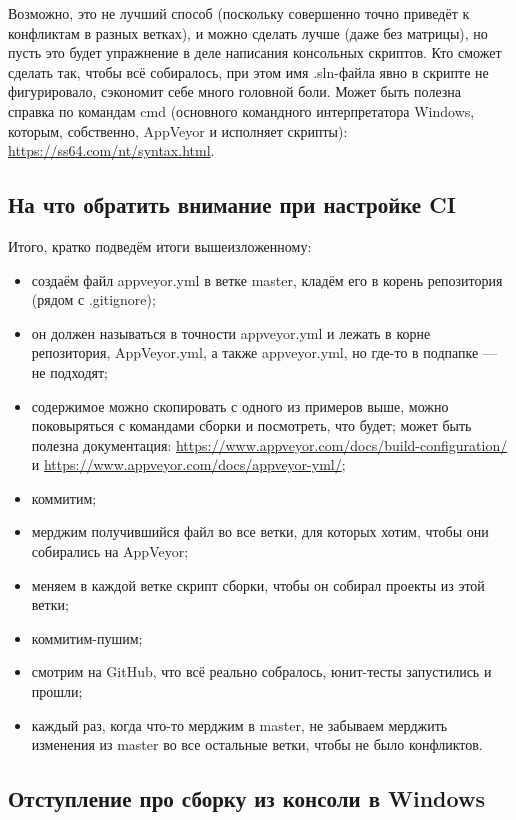 \documentclass[a5paper]{article}
\begin{document}
Возможно, это не лучший способ (поскольку совершенно точно приведёт к конфликтам в разных ветках), и можно сделать лучше (даже без матрицы), но пусть это будет упражнение в деле написания консольных скриптов. Кто сможет сделать так, чтобы всё собиралось, при этом имя .sln-файла явно в скрипте не фигурировало, сэкономит себе много головной боли. Может быть полезна справка по командам cmd (основного командного интерпретатора Windows, которым, собственно, AppVeyor и исполняет скрипты): \url{https://ss64.com/nt/syntax.html}.

\subsection{На что обратить внимание при настройке CI}

Итого, кратко подведём итоги вышеизложенному:

\begin{itemize}
	\item создаём файл appveyor.yml в ветке master, кладём его в корень репозитория (рядом с .gitignore);
	\item он должен называться в точности appveyor.yml и лежать в корне репозитория, AppVeyor.yml, а также appveyor.yml, но где-то в подпапке --- не подходят;
	\item содержимое можно скопировать с одного из примеров выше, можно поковыряться с командами сборки и посмотреть, что будет; может быть полезна документация: \url{https://www.appveyor.com/docs/build-configuration/} и \url{https://www.appveyor.com/docs/appveyor-yml/};
	\item коммитим;
	\item мерджим получившийся файл во все ветки, для которых хотим, чтобы они собирались на AppVeyor;
	\item меняем в каждой ветке скрипт сборки, чтобы он собирал проекты из этой ветки;
	\item коммитим-пушим;
	\item смотрим на GitHub, что всё реально собралось, юнит-тесты запустились и прошли;
	\item каждый раз, когда что-то мерджим в master, не забываем мерджить изменения из master во все остальные ветки, чтобы не было конфликтов.
\end{itemize}

\subsection{Отступление про сборку из консоли в Windows}
\end{document}
